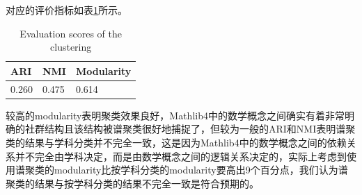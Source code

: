 对应的评价指标如表\ref{tab:score}所示。
\begin{table}
  \centering
  \begin{tabular}{lll}
    \toprule
    ARI & NMI & Modularity\\
    \midrule
    0.260 & 0.475 & 0.614\\
    \bottomrule
  \end{tabular}
  \caption{Evaluation scores of the clustering}
  \label{tab:score}
\end{table}

较高的modularity表明聚类效果良好，Mathlib4中的数学概念之间确实有着非常明确的社群结构且该结构被谱聚类很好地捕捉了，但较为一般的ARI和NMI表明谱聚类的结果与学科分类并不完全一致，这是因为Mathlib4中的数学概念之间的依赖关系并不完全由学科决定，而是由数学概念之间的逻辑关系决定的，实际上考虑到使用谱聚类的modularity比按学科分类的modularity要高出9个百分点，我们认为谱聚类的结果与按学科分类的结果不完全一致是符合预期的。

